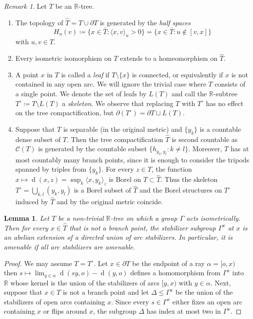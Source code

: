 \documentclass[12pt,nosumlimits,nonamelimits]{amsart}
\newtheorem{lem}[thm]{Lemma}
\theoremstyle{remark}
\newtheorem{rem}[thm]{Remark}
\theoremstyle{definition}
\newcommand{\IR}{\mathbb{R}}
\newcommand{\cC}{\mathcal{C}}
\newcommand{\Ga}{\Gamma}
\DeclareMathOperator{\dist}{d}
\newcommand{\ip}[1]{\mathopen{\langle}#1\mathclose{\rangle}}
\begin{document}
\begin{rem}\label{rem:sepRtree}
Let $T$ be an $\IR$-tree. 
\begin{enumerate}
\item 
The topology of $\hat{T} = T\cup\partial T$ 
is generated by the \emph{half spaces} 
\[
H_u(v) \coloneq \{ x\in \bar{T} : \ip{x,v}_u > 0 \} = \{ x\in\bar{T} : u\notin[v,x]\} 
\] 
with $u,v\in T$. 
\item 
Every isometric isomorphism on $T$ extends to 
a homeomorphism on $\hat{T}$. 
\item
A point $x$ in $T$ is called a \emph{leaf} 
if $T\setminus\{x\}$ is connected, or equivalently if $x$ is not contained 
in any open arc. 
We will ignore the trivial case where $T$ consists of a single point. 
We denote the set of leafs by $L(T)$ and call the $\IR$-subtree 
$T^\circ \coloneq T\setminus L(T)$ a \emph{skeleton}.  
We observe that replacing $T$ with $T^\circ$ 
has no effect on the tree compactification, but 
$\partial (T^\circ) = \partial T \sqcup L(T)$. 
\item\label{remitem:sep}
Suppose that $T$ is separable (in the original metric) 
and $\{y_k\}$ is a countable dense subset of $T$.
Then 
the tree compactification $\hat{T}$ is second countable as 
$\cC(T)$ is generated by the countable subset $\{h_{y_k,y_l} : k\neq l\}$. 
Moreover, $T$ has at most countably many branch points, 
since it is enough to consider the tripods spanned by triples from $\{ y_k\}$. 
For every $z\in T$, the function 
$x\mapsto\dist(x,z) = \sup_k\ip{x,y_k}_z$ is Borel on $T \subset \hat{T}$. 
Thus the skeleton $T^\circ = \bigcup_{k,l} (y_k,y_l)$ is a Borel subset 
of $\hat{T}$ and the Borel structures on $T^\circ$ 
induced by $\hat{T}$ and by the original metric coincide.
\end{enumerate}
\end{rem}

\begin{lem}\label{lem:nbst}
Let $T$ be a non-trivial $\IR$-tree on which 
a group $\Ga$ acts isometrically. 
Then for every $x\in \hat{T}$ that is not a branch point, 
the stabilizer subgroup $\Ga^x$ at $x$ is an abelian extension 
of a directed union of arc stabilizers. 
In particular, it is amenable if all arc stabilizers are amenable. 
\end{lem}
\begin{proof}
We may assume $T=T^\circ$. 
Let $x\in\partial T$ be the endpoint of a ray $\alpha = [o,x)$  
then $s\mapsto \lim_{y\in\alpha} \dist(sy,o)-\dist(y,o)$ defines 
a homomorphism from $\Ga^x$ into $\IR$ whose kernel is 
the union of the stabilizers of arcs $[y,x)$ with $y\in\alpha$. 
Next, suppose that $x\in T$ is not a branch point 
and let $\Delta\le\Ga^x$ be the union 
of the stabilizers of open arcs containing $x$. 
Since every $s\in \Ga^x$ either fixes an open arc 
containing $x$ or flips around $x$, 
the subgroup $\Delta$ has index at most two in $\Ga^x$. 
\end{proof}
%
%
\end{document}
